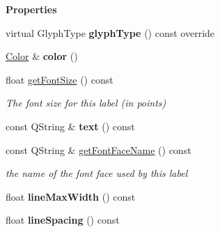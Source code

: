 \begin{Indent}\textbf{ Properties}\par
\begin{DoxyCompactItemize}
\item 
\mbox{\label{classrev_1_1_label_a4bb69fa071efabb38ce425bcd926a7da}} 
virtual Glyph\+Type {\bfseries glyph\+Type} () const override
\item 
\mbox{\label{classrev_1_1_label_ab365e33d687d4bfb53389c923cb071bc}} 
\mbox{\hyperlink{classrev_1_1_color}{Color}} \& {\bfseries color} ()
\item 
\mbox{\label{classrev_1_1_label_ae86c0817bd10c465de6c939129460412}} 
float \mbox{\hyperlink{classrev_1_1_label_ae86c0817bd10c465de6c939129460412}{get\+Font\+Size}} () const
\begin{DoxyCompactList}\small\item\em The font size for this label (in points) \end{DoxyCompactList}\item 
\mbox{\label{classrev_1_1_label_a11612c13fef4053fd18ddfb6c7c003f3}} 
const Q\+String \& {\bfseries text} () const
\item 
\mbox{\label{classrev_1_1_label_a319d11f22b012fad36344f15a329f140}} 
const Q\+String \& \mbox{\hyperlink{classrev_1_1_label_a319d11f22b012fad36344f15a329f140}{get\+Font\+Face\+Name}} () const
\begin{DoxyCompactList}\small\item\em the name of the font face used by this label \end{DoxyCompactList}\item 
\mbox{\label{classrev_1_1_label_a836ec436ac9d05ce68b3d68920b15c6f}} 
float {\bfseries line\+Max\+Width} () const
\item 
\mbox{\label{classrev_1_1_label_a454b640beb96f41d441798d029cff72a}} 
float {\bfseries line\+Spacing} () const
\end{DoxyCompactItemize}
\end{Indent}
